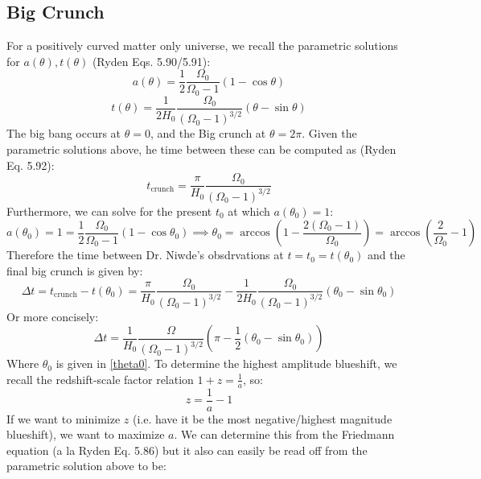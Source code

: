 \subsection{Big Crunch}
For a positively curved matter only universe, we recall the parametric solutions for $a(\theta), t(\theta)$ (Ryden Eqs. 5.90/5.91):
\begin{equation}
    a(\theta) = \frac{1}{2}\frac{\Omega_0}{\Omega_0 - 1}(1 - \cos\theta)
\end{equation}
\begin{equation}
    t(\theta) = \frac{1}{2H_0}\frac{\Omega_0}{(\Omega_0 - 1)^{3/2}}(\theta - \sin\theta)
\end{equation}
The big bang occurs at $\theta = 0$, and the Big crunch at $\theta = 2\pi$. Given the parametric solutions above, he time between these can be computed as (Ryden Eq. 5.92):
\begin{equation}
    t_{\text{crunch}} = \frac{\pi}{H_0}\frac{\Omega_0}{(\Omega_0 - 1)^{3/2}}
\end{equation}
Furthermore, we can solve for the present $t_0$ at which $a(\theta_0) = 1$:
\begin{equation}\label{theta0}
    a(\theta_0) = 1 = \frac{1}{2}\frac{\Omega_0}{\Omega_0 - 1}(1 - \cos\theta_0) \implies \theta_0 = \arccos\left(1 - \frac{2(\Omega_0 - 1)}{\Omega_0}\right) = \arccos\left(\frac{2}{\Omega_0} - 1\right)
\end{equation}
Therefore the time between Dr. Niwde's obsdrvations at $t = t_0 = t(\theta_0)$ and the final big crunch is given by:
\begin{equation}
    \Delta t = t_{\text{crunch}} - t(\theta_0) = \frac{\pi}{H_0}\frac{\Omega_0}{(\Omega_0 - 1)^{3/2}} - \frac{1}{2H_0}\frac{\Omega_0}{(\Omega_0 - 1)^{3/2}}(\theta_0 - \sin\theta_0)
\end{equation}
Or more concisely:
\begin{equation}
    \boxed{\Delta t = \frac{1}{H_0}\frac{\Omega}{(\Omega_0 - 1)^{3/2}}\left(\pi - \frac{1}{2}(\theta_0 - \sin\theta_0)\right)}
\end{equation}
Where $\theta_0$ is given in \eqref{theta0}. To determine the highest amplitude blueshift, we recall the redshift-scale factor relation $1 + z = \frac{1}{a}$, so:
\begin{equation}
    z = \frac{1}{a} - 1
\end{equation}
If we want to minimize $z$ (i.e. have it be the most negative/highest magnitude blueshift), we want to maximize $a$. We can determine this from the Friedmann equation (a la Ryden Eq. 5.86) but it also can easily be read off from the parametric solution above to be:
